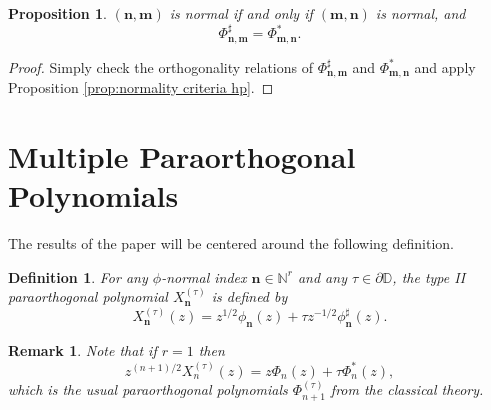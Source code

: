 \documentclass[reqno,centertags,11pt,draft]{amsart}
\newtheorem{prop}[thm]{Proposition}
\newtheorem{rem}[thm]{Remark}
\newtheorem{defn}[thm]{Definition}
\newcommand{\N}{\mathbb{N}}
\newcommand{\T}{\mathbb{\partial\mathbb{D}}}
\begin{document}
\begin{prop}\label{prop:n,m normality vs m,n normality}
    $(\bm{n},\bm{m})$ is normal if and only if $(\bm{m},\bm{n})$ is normal, and 
    \begin{equation}
        \Phi_{\bm{n},\bm{m}}^\sharp = \Phi_{\bm{m},\bm{n}}^*.
    \end{equation}
\end{prop}

\begin{proof}
    Simply check the orthogonality relations of $\Phi_{\bm{n},\bm{m}}^\sharp$ and $\Phi_{\bm{m},\bm{n}}^*$ and apply Proposition \ref{prop:normality criteria hp}.
\end{proof}

\section{Multiple Paraorthogonal Polynomials}\label{multiple popuc section}

The results of the paper will be centered around the following definition. 

\begin{defn}\label{def:para}
For any $\phi$-normal index $\bm{n}\in\N^r$ and any $\tau\in\T$, the type II paraorthogonal polynomial $X_{\bm{n}}^{(\tau)}$ is defined by
\begin{equation}\label{eq:paraorthogonal polynomials defn}
    X_{\bm{n}}^{(\tau)}(z) = z^{1/2}\phi_{\bm{n}}(z) + \tau z^{-1/2}\phi_{\bm{n}}^\sharp(z).
\end{equation}
\end{defn}
\begin{rem}
    Note that if $r=1$ then 
\begin{equation}
    z^{(n+1)/2} X_{n}^{(\tau)}(z) =   z\Phi_{n}(z) + \tau \Phi_{n}^*(z),
\end{equation} 
which is the usual paraorthogonal polynomials $\Phi_{n+1}^{(\tau)}$ from the classical theory.
\end{rem}

\end{document}
